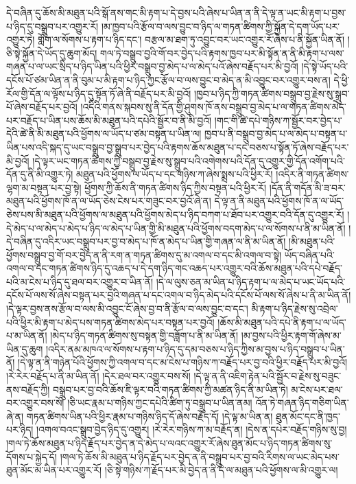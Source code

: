 དེ་བཞིན་དུ་ཆོས་མི་མཐུན་པའི་སྒོ་ནས་གང་མི་རྟག་པ་དེ་བྱས་པའི་ཞེས་པ་ཡིན་ན་ནི་དེ་ལྟ་ན་ཡང་མི་རྟག་པ་བྱས་པ་ཉིད་དུ་བསྒྲུབ་པར་འགྱུར་རོ། །མ་ཁྱབ་པའི་རྩོལ་བ་ལས་བྱུང་བ་ཉིད་ལ་གཏན་ཚིགས་ཀྱི་སྐྱོན་དེ་དག་ཡོད་པར་འགྱུར་ཏེ། གློག་ལ་སོགས་པ་རྟག་པ་ཉིད་དང་། བརྩལ་མ་ཐག་ཏུ་འབྱུང་བར་ཡང་འགྱུར་རོ་ཞེས་པ་ནི་སྐྱོན་ཡིན་ནོ། །ཅི་སྟེ་སྐྱོན་དེ་ཡོད་དུ་ཆུག་མོད། གལ་ཏེ་བསྒྲུབ་བྱའི་གོ་བར་བྱེད་པའི་རྟགས་ཁྱབ་པར་མི་སྟོན་ན་ནི་མི་རྟག་པ་ལས་གཞན་པ་ལ་ཡང་སྲིད་པ་ཉིད་ཡིན་པའི་ཕྱིར་བསྒྲུབ་བྱ་མེད་པ་ལ་མེད་པའོ་ཞེས་བརྗོད་པར་མི་བྱའོ། །དེ་སྟེ་ཡོད་པའི་དངོས་པོ་ཙམ་ཡིན་ན་ནི་བུམ་པ་མི་རྟག་པ་ཉིད་ཀྱང་རྩོལ་བ་ལས་བྱུང་བ་མེད་ན་མི་འབྱུང་བར་འགྱུར་བས་ན། དེ་ཕྱི་རོལ་གྱི་དོན་ལ་ལྟོས་པ་ཉིད་དུ་སྟོན་ཏོ་ཞེ་ནི་བརྗོད་པར་མི་བྱའོ། །ཁྱབ་པ་ཉིད་ཀྱི་གཏན་ཚིགས་བསྒྲུབ་བྱ་རྗེས་སུ་སྒྲུབ་པོ་ཞེས་བརྗོད་པར་བྱའོ། །འདིའི་གནས་སྐབས་སུ་ནི་དོན་གྱི་ཤུགས་ཁོ་ནས་བསྒྲུབ་བྱ་མེད་པ་ལ་གཏན་ཚིགས་མེད་པར་བརྗོད་པ་ཡིན་པས་ཆོས་མི་མཐུན་པའི་དཔེའི་སྦྱོར་བ་ནི་མི་བྱའོ། །གང་གི་ཚེ་དཔེ་གཉིས་ཀ་སྦྱོར་བར་བྱེད་པ་དེའི་ཚེ་ནི་མི་མཐུན་པའི་ཕྱོགས་ལ་ཡོད་པ་ཙམ་བསྟན་པ་ཡིན་ལ། ཁྱབ་པ་ནི་བསྒྲུབ་བྱ་མེད་པ་ལ་མེད་པ་བསྟན་པ་ཡིན་པས་འདི་སྐད་དུ་ཡང་བསྒྲུབ་བྱ་སྒྲུབ་པར་བྱེད་པའི་རྟགས་ཆོས་མཐུན་པ་དང་བཅས་པ་སྟོན་ཏོ་ཞེས་བརྗོད་པར་མི་བྱའོ། །དེ་ལྟར་ཡང་གཏན་ཚིགས་ཀྱི་བསྒྲུབ་བྱ་རྗེས་སུ་སྒྲུབ་པའི་འགེགས་པའི་དོན་དུ་འགྱུར་གྱི་དོན་འགོག་པའི་དོན་དུ་ནི་མི་འགྱུར་ཏེ། མཐུན་པའི་ཕྱོགས་ལ་ཡོད་པ་དང་གཉིས་ཀ་ཞེས་སྨྲས་པའི་ཕྱིར་རོ། །འདིར་ནི་གཏན་ཚིགས་ལྷག་མ་བསྟན་པར་བྱ་སྟེ། ཕྱོགས་ཀྱི་ཆོས་ནི་གཏན་ཚིགས་ཉིད་ཀྱིས་བསྟན་པའི་ཕྱིར་རོ། །དོན་ནི་གདོན་མི་ཟ་བར་མཐུན་པའི་ཕྱོགས་ཁོ་ན་ལ་ཡོད་ཅེས་ངེས་པར་གཟུང་བར་བྱའོ་ཞེ་ན། དེ་ལྟ་ན་ནི་མཐུན་པའི་ཕྱོགས་ཁོ་ན་ལ་ཡོད་ཅེས་པས་མི་མཐུན་པའི་ཕྱོགས་ལ་མཐུན་པའི་ཕྱོགས་མེད་པ་ཉིད་བཀག་པ་ཐོབ་པར་འགྱུར་བའི་དོན་དུ་འགྱུར་རོ། །དེ་མེད་པ་ལ་མེད་པ་མེད་པ་ཉིད་ལ་མེད་པ་ཡིན་གྱི་མི་མཐུན་པའི་ཕྱོགས་བདག་མེད་པ་ལ་སོགས་པ་ནི་མ་ཡིན་ནོ། །དེ་བཞིན་དུ་འདིར་ཡང་བསྒྲུབ་པར་བྱ་བ་མེད་པ་ཁོ་ན་མེད་པ་ཡིན་གྱི་གཞན་ལ་ནི་མ་ཡིན་ནོ། །མི་མཐུན་པའི་ཕྱོགས་བསྒྲུབ་བྱ་གོ་བར་བྱེད་ན་ནི་རག་ན་གཏན་ཚིགས་དུ་མ་འགལ་བ་དང་མི་འགལ་བ་སྟེ། ཡོད་བཞིན་པའི་འགལ་བ་དང་གཏན་ཚིགས་ཉིད་དུ་འཆད་པ་དེ་དག་ཉིད་གང་འཆད་པར་འགྱུར་བའི་ཆོས་མཐུན་པའི་དཔེ་བརྗོད་པའི་མ་ངེས་པ་ཉིད་དུ་ཐལ་བར་འགྱུར་བ་ཡིན་ནོ། །དེ་ལ་ལུས་ཅན་མ་ཡིན་པ་ཉིད་རྟག་པ་ལ་མེད་པ་ཡང་ཡོད་པའི་དངོས་པོ་ལས་སོ་ཞེས་བསྟན་པར་བྱའི་གཞན་པ་དང་འགལ་བ་ཉིད་མེད་པའི་དངོས་པོ་ལས་སོ་ཞེས་པ་ནི་མ་ཡིན་ནོ། །དེ་ལྟར་བྱས་ནས་རྩོལ་བ་ལས་མི་འབྱུང་ངོ་ཞེས་བྱ་བ་ནི་རྩོལ་བ་ལས་བྱུང་བ་དང་། མི་རྟག་པ་ཉིད་རྗེས་སུ་འབྲེལ་པའི་ཕྱིར་མི་རྟག་པ་མེད་པས་གཏན་ཚིགས་མེད་པར་བསྟན་པར་བྱའོ། །ཆོས་མི་མཐུན་པའི་དཔེ་ནི་རྟག་པ་ལ་ཡོད་པ་མ་ཡིན་ནོ། །མེད་པ་ཉིད་གཏན་ཚིགས་སུ་བསྟན་གྱི་བཟློག་པ་ནི་མ་ཡིན་ནོ། །མ་བྱས་པའི་ཕྱིར་རྟག་གོ་ཞེས་མ་ཡིན་དུ་ཆུག །འདིར་ནམ་མཁའ་ལ་སོགས་པ་རྟག་པ་ཉིད་དུ་དམ་བཅས་པ་ཉིད་ཀྱིས་མ་བྱས་པ་ཉིད་བསྒྲུབ་པ་ཡིན་ནོ། །དེ་ལྟ་ན་ནི་གཉེན་པོའི་ཕྱོགས་ཀྱི་འགལ་བ་དང་མ་ངེས་པ་གཉིས་ཀ་བརྗོད་པར་བྱ་བའི་ཕྱིར་བརྗོད་པར་མི་བྱའོ། །རེ་རེར་བརྗོད་པ་ནི་མ་ཡིན་ནོ། །དེར་ཐལ་བར་འགྱུར་བས་སོ། །དེ་ལྟ་ན་ནི་འཇིག་རྟེན་པའི་སྦྱོར་བ་རྗེས་སུ་བཟུང་ནས་བརྗོད་ཀྱི། བསྒྲུབ་པར་བྱ་བའི་ཆོས་ཇི་ལྟར་བའི་གཏན་ཚིགས་ཀྱི་མཚན་ཉིད་ནི་མ་ཡིན་ཏེ། མ་ངེས་པར་ཐལ་བར་འགྱུར་བས་སོ། །ཅི་ཡང་རྣམ་པ་གཉིས་ཀྱང་དཔེའི་ཚིག་ཏུ་བསྒྲུབ་པ་ཡིན་ནམ། འོན་ཏེ་གཞན་ཉིད་གཅིག་ཡིན་ཞེ་ན། གཏན་ཚིགས་ཡིན་པའི་ཕྱིར་རྣམ་པ་གཉིས་ཉིད་དོ་ཞེས་བརྗོད་དོ། །དེ་ལྟ་མ་ཡིན་ན། ཐུན་མོང་དང་ནི་ཁྱད་པར་ཉིད། །འགལ་བའང་སྒྲུབ་བྱེད་ཉིད་དུ་འགྱུར། །རེ་རེར་གཉིས་ཀ་མ་བརྗོད་ན། །དེས་ན་དཔེར་བརྗོད་གཉིས་སུ་བྱ། །གལ་ཏེ་ཆོས་མཐུན་པ་ཉིད་རྗོད་པར་བྱེད་ན་དེ་མེད་པ་ལའང་འགྱུར་རོ་ཞེས་ཐུན་མོང་པ་ཉིད་གཏན་ཚིགས་སུ་དོགས་པ་སྐྱེད་དོ། །གལ་ཏེ་ཆོས་མི་མཐུན་པ་ཉིད་རྗོད་པར་བྱེད་ན་ནི་བསྒྲུབ་པར་བྱ་བའི་རིགས་ལ་ཡང་མེད་པས་ཐུན་མོང་མ་ཡིན་པར་འགྱུར་རོ། །ཅི་སྟེ་གཉིས་ཀ་རྗོད་པར་མི་བྱེད་ན་ནི་དེ་ལ་མཐུན་པའི་ཕྱོགས་ལ་མི་འགྱུར་ལ། 